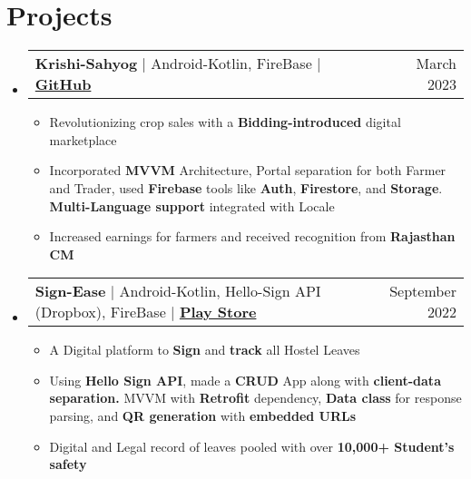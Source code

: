 \documentclass[letterpaper,11pt]{article}
\makeatletter
\newcommand{\resumeItem}[1]{
  \item\small{
    {#1 \vspace{-2pt}}
  }
}
\newcommand{\resumeProjectHeading}[2]{
    \item
    \begin{tabular*}{0.97\textwidth}{l@{\extracolsep{\fill}}r}
      \small#1 & #2 \\
    \end{tabular*}\vspace{-7pt}
}
\newcommand{\resumeSubHeadingListStart}{\begin{itemize}[leftmargin=0.15in, label={}]}
\newcommand{\resumeSubHeadingListEnd}{\end{itemize}}
\newcommand{\resumeItemListStart}{\begin{itemize}}
\newcommand{\resumeItemListEnd}{\end{itemize}\vspace{-5pt}}
\makeatother
\begin{document}
\section{\textbf{Projects}}
\resumeSubHeadingListStart
      \resumeProjectHeading
          {\textbf{Krishi-Sahyog } $|$ {Android-Kotlin, FireBase} $|$ \textbf{\href{https://github.com/aniketk13/FarmApp}{GitHub}}}{March 2023}
          \resumeItemListStart
          \resumeItem{Revolutionizing crop sales with a \textbf{Bidding-introduced} digital marketplace}
          \resumeItem{Incorporated \textbf{MVVM} Architecture, Portal separation for both Farmer and Trader, used \textbf{Firebase} tools like \textbf{Auth}, \textbf{Firestore}, and \textbf{Storage}. \textbf{Multi-Language support} integrated with Locale}
          \resumeItem{Increased earnings for farmers and received recognition from \textbf{Rajasthan CM}}
          \resumeItemListEnd
    \resumeSubHeadingListEnd
 \resumeSubHeadingListStart
      \resumeProjectHeading
          {\textbf{Sign-Ease } $|${ Android-Kotlin, Hello-Sign API (Dropbox), FireBase} $|$ \textbf{\href{https://play.google.com/store/apps/details?id=com.teamdefine.signease}{Play Store}} }{September 2022}
          \resumeItemListStart
          \resumeItem{A Digital platform to \textbf{Sign} and \textbf{track} all Hostel Leaves}
          \resumeItem{Using \textbf{Hello Sign API}, made a \textbf{CRUD} App along with \textbf{client-data separation.} MVVM with \textbf{Retrofit} dependency, \textbf{Data class} for response parsing, and \textbf{QR generation} with \textbf{embedded URLs}}
          \resumeItem{Digital and Legal record of leaves pooled with over \textbf{10,000+ Student's safety}}
          \resumeItemListEnd
    \resumeSubHeadingListEnd
    
    
\end{document}
